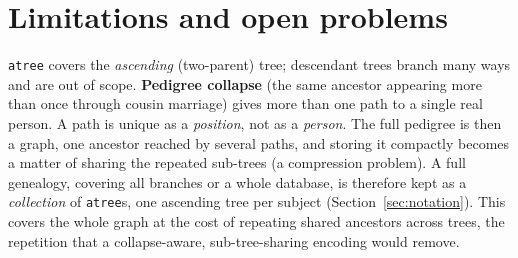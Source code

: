 \documentclass[11pt]{article}
\newcommand{\atree}{\texttt{atree}}
\begin{document}
\section{Limitations and open problems}
\label{sec:limitations}
\atree{} covers the \emph{ascending} (two-parent) tree; descendant trees branch many ways and are out
of scope. \textbf{Pedigree collapse} (the same ancestor appearing more than once through cousin
marriage) gives more than one path to a single real person. A path is unique as a \emph{position},
not as a \emph{person}. The full pedigree is then a graph, one ancestor reached by several paths,
and storing it compactly becomes a matter of sharing the repeated sub-trees (a compression problem).
A full genealogy, covering all branches or a whole database, is therefore kept as a
\emph{collection} of \atree{}s, one ascending tree per subject (Section~\ref{sec:notation}). This
covers the whole graph at the cost of repeating shared ancestors across trees, the repetition that a
collapse-aware, sub-tree-sharing encoding would remove.
\end{document}
